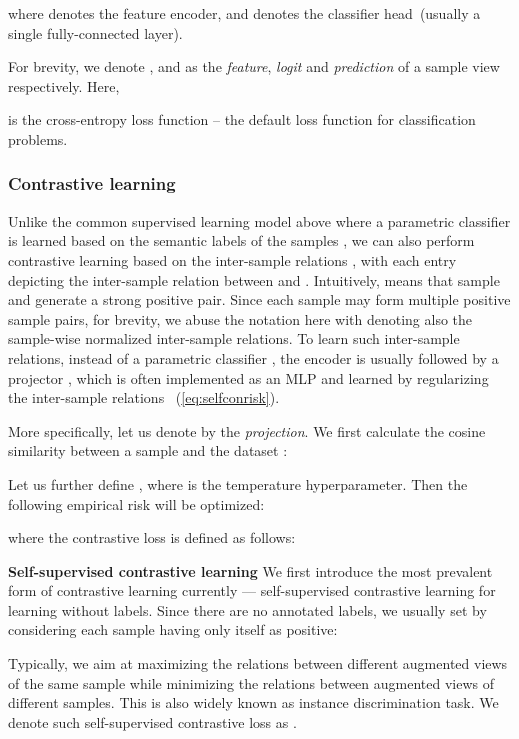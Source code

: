 \documentclass[10pt,twocolumn,letterpaper]{article}
\begin{document}
where  denotes the feature encoder, and  denotes the classifier head~(usually a single fully-connected layer).

For brevity, we denote ,  and  as the \textit{feature}, \textit{logit} and \textit{prediction} of a sample view  respectively. Here,

is the cross-entropy loss function -- the default loss function for classification problems.

\subsubsection{Contrastive learning}
Unlike the common supervised learning model above where a parametric classifier  is learned based on the semantic labels  of the samples , we can also perform contrastive learning based on the inter-sample relations , with each entry  depicting the inter-sample relation between  and . 
Intuitively,  means that sample  and  generate a strong positive pair. Since each sample may form multiple positive sample pairs, for brevity, we abuse the notation here with  denoting also the sample-wise normalized inter-sample relations.
To learn such inter-sample relations, instead of a parametric classifier , the  encoder is usually followed by a projector , which is often implemented as an MLP and learned by regularizing the inter-sample relations ~(\cref{eq:selfconrisk}). 

More specifically, let us denote by  the \textit{projection}. We first calculate the cosine similarity  between a sample  and the dataset :

Let us further define , where  is the temperature hyperparameter. Then the following empirical risk will be optimized:

where the contrastive loss  is defined as follows:




\noindent\textbf{Self-supervised contrastive learning}
\label{method_pre_selfcontratsive}
We first introduce the most prevalent form of contrastive learning currently --- self-supervised contrastive learning for learning without labels. Since there are no annotated labels, we usually set  by considering each sample having only itself as positive:

Typically, we aim at maximizing the relations between different augmented views of the same sample while minimizing the relations between augmented views of different samples. This is also widely known as instance discrimination task. We denote such self-supervised contrastive loss as .
\end{document}
